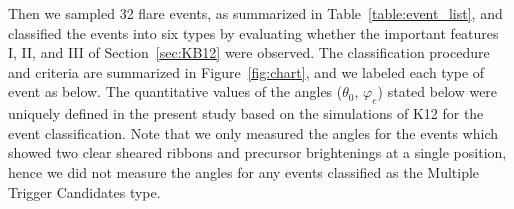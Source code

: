 \documentclass[10pt,preprint2]{aastex}
\begin{document}
\noindent Then we sampled 32 flare events, as summarized in Table~\ref{table:event_list}, and classified the events into six types by evaluating whether the important features I, I\hspace{-.1em}I, and I\hspace{-.1em}I\hspace{-.1em}I of Section~\ref{sec:KB12} were observed.
The classification procedure and criteria are summarized in Figure~\ref{fig:chart}, and we labeled each type of event as below.
The quantitative values of the angles ($\theta_{0}$, $\varphi_{e}$) stated below were uniquely defined in the present study based on the simulations of K12 for the event classification.
Note that we only measured the angles for the events which showed two clear sheared ribbons and precursor brightenings at a single position, hence we did not measure the angles for any events classified as the Multiple Trigger Candidates type.
\end{document}
